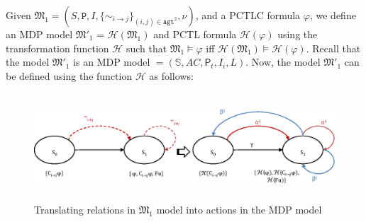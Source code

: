 Given $\mathfrak{M_1}=(S,\texttt{P},I,\{\sim_{i \rightarrow j}\}_{{(i,j)}\in \texttt{Agt}^2},\nu)$, and a PCTLC formula $\varphi$, we define an MDP model $\mathfrak{M'_1}$ = $\mathscr{H}(\mathfrak{M_1})$ and PCTL formula $\mathscr{H}(\varphi)$ using the transformation function $\mathscr{H}$ such that $\mathfrak{M_1} \models \varphi$ iff $\mathscr{H}(\mathfrak{M_1})\models \mathscr{H}(\varphi)$.  Recall that the model $\mathfrak{M'_1}$ is an MDP model  $= (\mathbb{S}, AC, \textsf{P}_t ,I_i, L)$. Now, the model $\mathfrak{M'_1}$ can be defined using the function $\mathscr{H}$ as follows:


\begin{figure}[!htp]
\begin{center}
\includegraphics [width=12cm, height=4cm]{chap3/img/relation-translation.eps}
  \caption{Translating relations in $\mathfrak{M_1}$ model into actions in the MDP model}
\label{fig-relation-to-actions-cha3}
\end{center}
\end{figure}


